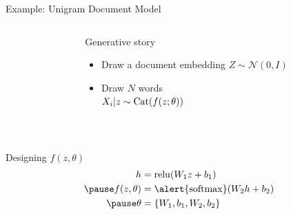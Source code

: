 \begin{frame}{Example: Unigram Document Model}


\begin{columns}
	\begin{column}{0.2\textwidth}
    \end{column}
    \begin{column}{0.75\textwidth}
    	Generative story 
    	\begin{itemize}
			\item Draw a document embedding $Z \sim \mathcal N(0, I)$
			\item Draw $N$ words\\
			$X_i|z \sim \operatorname{Cat}(f(z; \theta))$
		\end{itemize}
    \end{column}
    \end{columns}
    \pause
    
    ~
    
    Designing $f(z, \theta)$    \pause
    \begin{equation*}
	\begin{aligned}						
		h &= \relu(W_1z+b_1) \\ \pause
		f(z, \theta) &= \alert{\softmax}(W_2h + b_2) \\		\pause
		\theta &= \{W_1, b_1, W_2, b_2\}
	\end{aligned}
	\end{equation*}
	

\end{frame}

